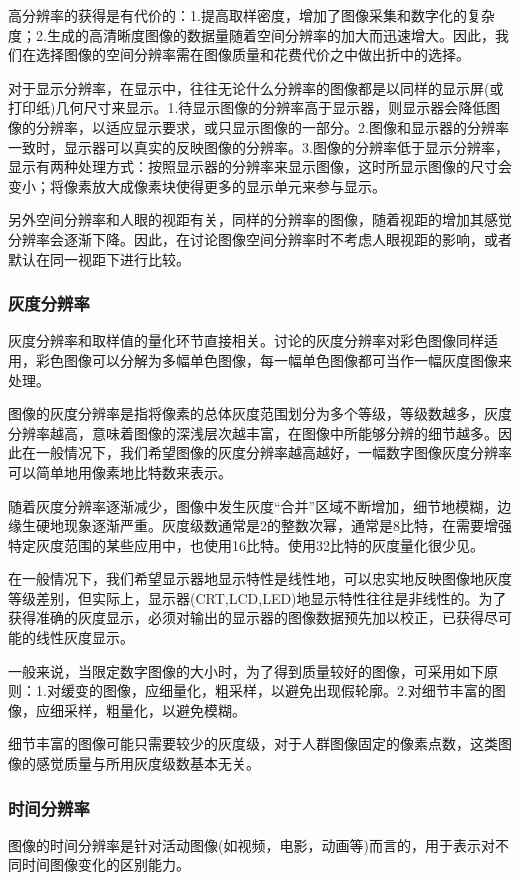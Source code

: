 \documentclass[11pt]{article}
\begin{document}
高分辨率的获得是有代价的：1.提高取样密度，增加了图像采集和数字化的复杂度；2.生成的高清晰度图像的数据量随着空间分辨率的加大而迅速增大。因此，我们在选择图像的空间分辨率需在图像质量和花费代价之中做出折中的选择。

对于显示分辨率，在显示中，往往无论什么分辨率的图像都是以同样的显示屏(或打印纸)几何尺寸来显示。1.待显示图像的分辨率高于显示器，则显示器会降低图像的分辨率，以适应显示要求，或只显示图像的一部分。2.图像和显示器的分辨率一致时，显示器可以真实的反映图像的分辨率。3.图像的分辨率低于显示分辨率，显示有两种处理方式：按照显示器的分辨率来显示图像，这时所显示图像的尺寸会变小；将像素放大成像素块使得更多的显示单元来参与显示。

另外空间分辨率和人眼的视距有关，同样的分辨率的图像，随着视距的增加其感觉分辨率会逐渐下降。因此，在讨论图像空间分辨率时不考虑人眼视距的影响，或者默认在同一视距下进行比较。
\subsubsection{灰度分辨率}
灰度分辨率和取样值的量化环节直接相关。讨论的灰度分辨率对彩色图像同样适用，彩色图像可以分解为多幅单色图像，每一幅单色图像都可当作一幅灰度图像来处理。

图像的灰度分辨率是指将像素的总体灰度范围划分为多个等级，等级数越多，灰度分辨率越高，意味着图像的深浅层次越丰富，在图像中所能够分辨的细节越多。因此在一般情况下，我们希望图像的灰度分辨率越高越好，一幅数字图像灰度分辨率可以简单地用像素地比特数来表示。

随着灰度分辨率逐渐减少，图像中发生灰度“合并”区域不断增加，细节地模糊，边缘生硬地现象逐渐严重。灰度级数通常是2的整数次幂，通常是8比特，在需要增强特定灰度范围的某些应用中，也使用16比特。使用32比特的灰度量化很少见。

在一般情况下，我们希望显示器地显示特性是线性地，可以忠实地反映图像地灰度等级差别，但实际上，显示器(CRT,LCD,LED)地显示特性往往是非线性的。为了获得准确的灰度显示，必须对输出的显示器的图像数据预先加以校正，已获得尽可能的线性灰度显示。

一般来说，当限定数字图像的大小时，为了得到质量较好的图像，可采用如下原则：1.对缓变的图像，应细量化，粗采样，以避免出现假轮廓。2.对细节丰富的图像，应细采样，粗量化，以避免模糊。

细节丰富的图像可能只需要较少的灰度级，对于人群图像固定的像素点数，这类图像的感觉质量与所用灰度级数基本无关。
\subsubsection{时间分辨率}
图像的时间分辨率是针对活动图像(如视频，电影，动画等)而言的，用于表示对不同时间图像变化的区别能力。
\end{document}
